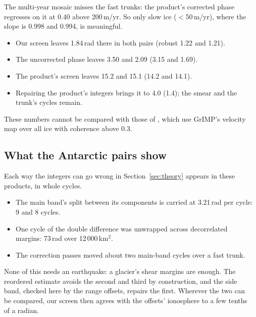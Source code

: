 The multi-year mosaic misses the fast trunks: the product's corrected phase regresses on it at 0.40 above 200\,m/yr.
So only slow ice ($<$50\,m/yr), where the slope is 0.998 and 0.994, is meaningful.
\begin{itemize}
  \item Our screen leaves 1.84\,rad there in both pairs (robust 1.22 and 1.21).
  \item The uncorrected phase leaves 3.50 and 2.09 (3.15 and 1.69).
  \item The product's screen leaves 15.2 and 15.1 (14.2 and 14.1).
  \item Repairing the product's integers brings it to 4.0 (1.4); the smear and the trunk's cycles remain.
\end{itemize}
These numbers cannot be compared with those of \citet{joughin2026nisarerrors}, which use GrIMP's velocity map over all
ice with coherence above 0.3.

\subsection{What the Antarctic pairs show}
Each way the integers can go wrong in Section~\ref{sec:theory} appears in these products, in whole cycles.
\begin{itemize}
  \item The main band's split between its components is carried at 3.21\,rad per cycle: 9 and 8 cycles.
  \item One cycle of the double difference was unwrapped across decorrelated margins: 73\,rad over 12\,000\,km$^2$.
  \item The correction passes moved about two main-band cycles over a fast trunk.
\end{itemize}
None of this needs an earthquake: a glacier's shear margins are enough. The reordered estimate avoids the second and
third by construction, and the side band, checked here by the range offsets, repairs the first. Wherever the two can be
compared, our screen then agrees with the offsets' ionosphere to a few tenths of a radian.
